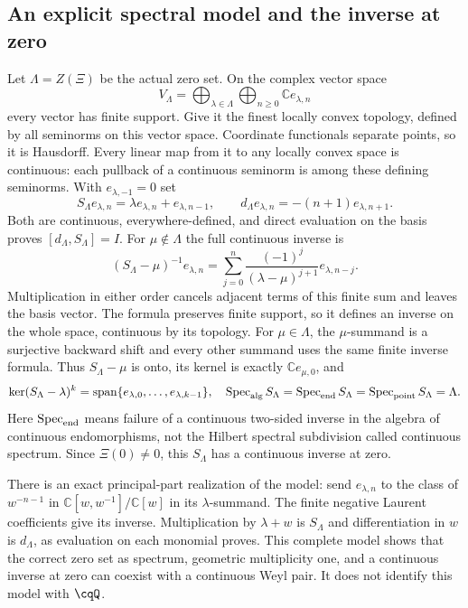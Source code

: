 \subsection{An explicit spectral model and the inverse at zero}

Let $\Lambda=Z(\Xi)$ be the actual zero set. On the complex
vector space
\[
 V_\Lambda=\bigoplus_{\lambda\in\Lambda}
                   \bigoplus_{n\geq0}\mathbb C e_{\lambda,n}
\]
every vector has finite support. Give it the finest locally
convex topology, defined by all seminorms on this vector space.
Coordinate functionals separate points, so it is Hausdorff.
Every linear map from it to any locally convex space is
continuous: each pullback of a continuous seminorm is among
these defining seminorms.
With $e_{\lambda,-1}=0$ set
\[
 S_\Lambda e_{\lambda,n}=\lambda e_{\lambda,n}+e_{\lambda,n-1},
 \qquad d_\Lambda e_{\lambda,n}=-(n+1)e_{\lambda,n+1}.
\]
Both are continuous, everywhere-defined, and direct evaluation
on the basis proves $[d_\Lambda,S_\Lambda]=I$.
For $\mu\notin\Lambda$ the full continuous inverse is
\begin{equation}
 (S_\Lambda-\mu)^{-1}e_{\lambda,n}
 =\sum_{j=0}^n
       \frac{(-1)^j}{(\lambda-\mu)^{j+1}}e_{\lambda,n-j}.
 \label{eq:cq-source-model-resolvent}
\end{equation}
Multiplication in either order cancels adjacent terms of
this finite sum and leaves the basis vector. The formula
preserves finite support, so it defines an inverse on
the whole space, continuous by its topology.
For $\mu\in\Lambda$, the $\mu$-summand is a surjective
backward shift and every other summand uses the same finite
inverse formula. Thus $S_\Lambda-\mu$ is onto, its kernel
is exactly $\mathbb C e_{\mu,0}$, and
\begin{equation}
 \ker(S_\Lambda-\lambda)^k
   =\operatorname{span}\{e_{\lambda,0},\ldots,e_{\lambda,k-1}\},
 \quad
 \operatorname{Spec}_{\rm alg}S_\Lambda
  =\operatorname{Spec}_{\rm end}S_\Lambda
  =\operatorname{Spec}_{\rm point}S_\Lambda=\Lambda .
 \label{eq:cq-source-model-spectrum}
\end{equation}
Here $\operatorname{Spec}_{\rm end}$ means failure of a
continuous two-sided inverse in the algebra of continuous
endomorphisms, not the Hilbert spectral subdivision called
continuous spectrum. Since $\Xi(0)\ne0$, this $S_\Lambda$
has a continuous inverse at zero.

There is an exact principal-part realization of the model:
send $e_{\lambda,n}$ to the class of $w^{-n-1}$ in
$\mathbb C[w,w^{-1}]/\mathbb C[w]$ in its $\lambda$-summand.
The finite negative Laurent coefficients give its inverse.
Multiplication by $\lambda+w$ is $S_\Lambda$ and
differentiation in $w$ is $d_\Lambda$, as evaluation on
each monomial proves.
This complete model shows that the correct zero set as
spectrum, geometric multiplicity one, and a continuous
inverse at zero can coexist with a continuous Weyl pair.
It does not identify this model with $\cqQ$.

